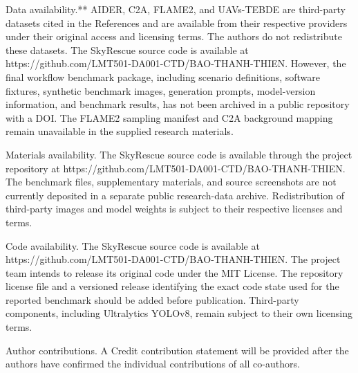 \documentclass[pdflatex,sn-mathphys-ay]{sn-jnl}
\begin{document}
Data availability.** AIDER, C2A, FLAME2, and UAVs-TEBDE are third-party datasets cited in the References and are available from their respective providers under their original access and licensing terms. The authors do not redistribute these datasets. The SkyRescue source code is available at https://github.com/LMT501-DA001-CTD/BAO-THANH-THIEN. However, the final workflow benchmark package, including scenario definitions, software fixtures, synthetic benchmark images, generation prompts, model-version information, and benchmark results, has not been archived in a public repository with a DOI. The FLAME2 sampling manifest and C2A background mapping remain unavailable in the supplied research materials.

Materials availability. The SkyRescue source code is available through the project repository at https://github.com/LMT501-DA001-CTD/BAO-THANH-THIEN. The benchmark files, supplementary materials, and source screenshots are not currently deposited in a separate public research-data archive. Redistribution of third-party images and model weights is subject to their respective licenses and terms.

Code availability. The SkyRescue source code is available at https://github.com/LMT501-DA001-CTD/BAO-THANH-THIEN. The project team intends to release its original code under the MIT License. The repository license file and a versioned release identifying the exact code state used for the reported benchmark should be added before publication. Third-party components, including Ultralytics YOLOv8, remain subject to their own licensing terms.

Author contributions. A Credit contribution statement will be provided after the authors have confirmed the individual contributions of all co-authors.

\backmatter

\end{document}
